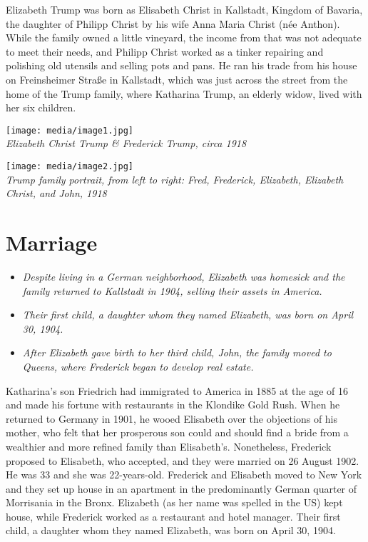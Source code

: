 Elizabeth Trump was born as Elisabeth Christ in Kallstadt, Kingdom of
Bavaria, the daughter of Philipp Christ by his wife Anna Maria Christ
(née Anthon). While the family owned a little vineyard, the income from
that was not adequate to meet their needs, and Philipp Christ worked as
a tinker repairing and polishing old utensils and selling pots and pans.
He ran his trade from his house on Freinsheimer Straße in Kallstadt,
which was just across the street from the home of the Trump family,
where Katharina Trump, an elderly widow, lived with her six children.

\texttt{[image: media/image1.jpg]}\\
\emph{Elizabeth Christ Trump \& Frederick Trump, circa 1918}

\texttt{[image: media/image2.jpg]}\\
\emph{Trump family portrait, from left to right: Fred, Frederick,
Elizabeth, Elizabeth Christ, and John, 1918}

\section{Marriage}\label{marriage}

\begin{itemize}
\item
  \emph{Despite living in a German neighborhood, Elizabeth was homesick
  and the family returned to Kallstadt in 1904, selling their assets in
  America.}
\item
  \emph{Their first child, a daughter whom they named Elizabeth, was
  born on April 30, 1904.}
\item
  \emph{After Elizabeth gave birth to her third child, John, the family
  moved to Queens, where Frederick began to develop real estate.}
\end{itemize}

Katharina's son Friedrich had immigrated to America in 1885 at the age
of 16 and made his fortune with restaurants in the Klondike Gold Rush.
When he returned to Germany in 1901, he wooed Elisabeth over the
objections of his mother, who felt that her prosperous son could and
should find a bride from a wealthier and more refined family than
Elisabeth's. Nonetheless, Frederick proposed to Elisabeth, who accepted,
and they were married on 26 August 1902. He was 33 and she was
22-years-old. Frederick and Elisabeth moved to New York and they set up
house in an apartment in the predominantly German quarter of Morrisania
in the Bronx. Elizabeth (as her name was spelled in the US) kept house,
while Frederick worked as a restaurant and hotel manager. Their first
child, a daughter whom they named Elizabeth, was born on April 30, 1904.

